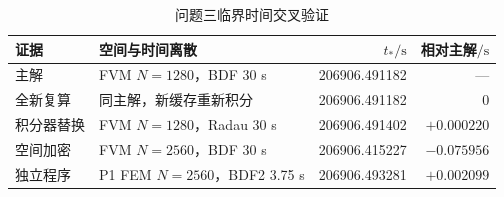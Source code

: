 \begin{table}[htbp]
  \caption{问题三临界时间交叉验证}
  \label{tab:q3-cross-validation}
  \centering
  \small
  \begin{tabular}{llrr}
    \toprule
    证据 & 空间与时间离散 & $t_*/\mathrm{s}$ & 相对主解$/\mathrm{s}$ \\
    \midrule
    主解 & FVM $N=1280$，BDF 30 s & 206906.491182 & --- \\
    全新复算 & 同主解，新缓存重新积分 & 206906.491182 & $0$ \\
    积分器替换 & FVM $N=1280$，Radau 30 s & 206906.491402 & $+0.000220$ \\
    空间加密 & FVM $N=2560$，BDF 30 s & 206906.415227 & $-0.075956$ \\
    独立程序 & P1 FEM $N=2560$，BDF2 3.75 s & 206906.493281 & $+0.002099$ \\
    \bottomrule
  \end{tabular}
\end{table}
